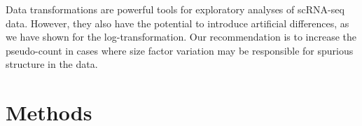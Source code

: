 \documentclass[10pt,letterpaper]{article}
\begin{document}
% 

Data transformations are powerful tools for exploratory analyses of scRNA-seq data.
However, they also have the potential to introduce artificial differences, as we have shown for the log-transformation.
Our recommendation is to increase the pseudo-count in cases where size factor variation may be responsible for spurious structure in the data.

\section{Methods}
\end{document}
